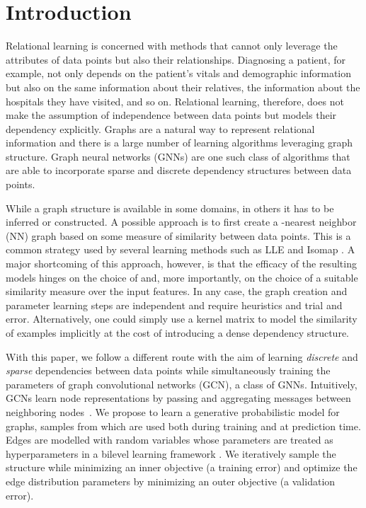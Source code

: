 \documentclass{article}
\begin{document}
\vspace{-6mm}


\section{Introduction}

Relational learning is concerned with methods that cannot only leverage  the attributes of data points but also their relationships. Diagnosing a patient, for example, not only depends on the patient's vitals and demographic information but also on the same information about their relatives, the information about the hospitals they have visited, and so on. Relational learning, therefore, does not make the assumption of independence between data points but models their dependency explicitly.   
Graphs are a natural way to represent relational information and there is a large number of learning algorithms leveraging graph structure. 
Graph  neural  networks  (GNNs) \citep{scarselli2009graph} are  one such class of algorithms that are able to incorporate sparse and discrete dependency structures between data points. 

While a graph structure is available in some domains, in others it has to  be inferred or constructed.
A possible approach is to first create a -nearest neighbor (NN) graph based on some measure of similarity between data points. This is a common strategy used by several learning methods such as LLE \citep{Roweis:2000} and Isomap \citep{tenenbaum2000global}. A major shortcoming of this approach, however, is that the efficacy of the resulting models hinges on the choice of  and, more importantly, on the choice of a suitable similarity measure over the input features. In any case, the graph creation and parameter learning steps are independent and require heuristics  and trial and error. Alternatively, one could simply use a kernel matrix to model 
the similarity of examples implicitly
at the cost of introducing 
a dense dependency structure. 


	








With this paper, we follow a different route with the aim of learning \emph{discrete} and \emph{sparse} dependencies between data points while simultaneously training the parameters of  graph convolutional networks (GCN), a class of GNNs. Intuitively, GCNs learn node representations by passing and aggregating messages between neighboring nodes~\citep{kipf2016semi,monti2017geometric,gilmer2017neural,hamilton2017inductive,duran2017learning,velickovic2017graph}. We propose to learn a generative probabilistic model for graphs, samples from which are used both during training and at prediction time. 
Edges are modelled with random variables whose parameters are treated as hyperparameters in a bilevel learning framework \citep{franceschi2018bilevel}. We iteratively sample the structure while minimizing an inner objective (a training error) 
and optimize the edge distribution parameters by minimizing an outer objective (a validation error). 
\end{document}

